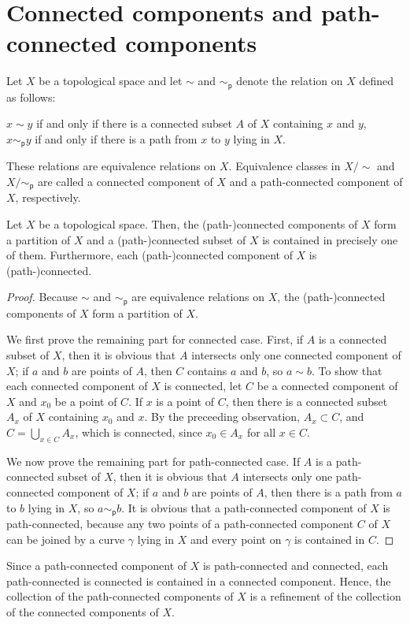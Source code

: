 \section{Connected components and path-connected components}

\begin{defi}
    Let $X$ be a topological space and let $\sim$ and $\sim_\textsf{p}$ denote the relation on $X$ defined as follows:
    \begin{center}
        $x\sim y$ if and only if there is a connected subset $A$ of $X$ containing $x$ and $y$,\\
        $x\sim_\textsf{p} y$ if and only if there is a path from $x$ to $y$ lying in $X$.
    \end{center}
    These relations are equivalence relations on $X$.
    Equivalence classes in $X/\sim$ and $X/\sim_\textsf{p}$ are called a connected component of $X$ and a path-connected component of $X$, respectively.
\end{defi}

\begin{prop}
    Let $X$ be a topological space.
    Then, the (path-)connected components of $X$ form a partition of $X$ and a (path-)connected subset of $X$ is contained in precisely one of them.
    Furthermore, each (path-)connected component of $X$ is (path-)connected.
\end{prop}
\begin{proof}
    Because $\sim$ and $\sim_\textsf{p}$ are equivalence relations on $X$, the (path-)connected components of $X$ form a partition of $X$.
    
    We first prove the remaining part for connected case.
    First, if $A$ is a connected subset of $X$, then it is obvious that $A$ intersects only one connected component of $X$; if $a$ and $b$ are points of $A$, then $C$ contains $a$ and $b$, so $a\sim b$.
    To show that each connected component of $X$ is connected, let $C$ be a connected component of $X$ and $x_0$ be a point of $C$.
    If $x$ is a point of $C$, then there is a connected subset $A_x$ of $X$ containing $x_0$ and $x$.
    By the preceeding observation, $A_x\subset C$, and $C=\bigcup_{x\in C} A_x$, which is connected, since $x_0\in A_x$ for all $x\in C$.

    We now prove the remaining part for path-connected case.
    If $A$ is a path-connected subset of $X$, then it is obvious that $A$ intersects only one path-connected component of $X$; if $a$ and $b$ are points of $A$, then there is a path from $a$ to $b$ lying in $X$, so $a\sim_\textsf{p} b$.
    It is obvious that a path-connected component of $X$ is path-connected, because any two points of a path-connected component $C$ of $X$ can be joined by a curve $\gamma$ lying in $X$ and every point on $\gamma$ is contained in $C$.
\end{proof}
\begin{rmk}
    Since a path-connected component of $X$ is path-connected and connected, each path-connected is connected is contained in a connected component.
    Hence, the collection of the path-connected components of $X$ is a refinement of the collection of the connected components of $X$.
\end{rmk}

